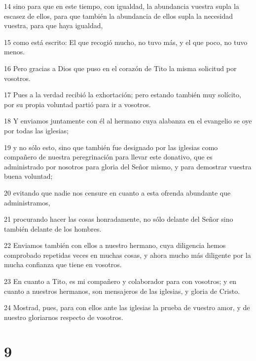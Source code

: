 \par 14 sino para que en este tiempo, con igualdad, la abundancia vuestra supla la escasez de ellos, para que también la abundancia de ellos supla la necesidad vuestra, para que haya igualdad,
\par 15 como está escrito: El que recogió mucho, no tuvo más, y el que poco, no tuvo menos.
\par 16 Pero gracias a Dios que puso en el corazón de Tito la misma solicitud por vosotros.
\par 17 Pues a la verdad recibió la exhortación; pero estando también muy solícito, por su propia voluntad partió para ir a vosotros.
\par 18 Y enviamos juntamente con él al hermano cuya alabanza en el evangelio se oye por todas las iglesias;
\par 19 y no sólo esto, sino que también fue designado por las iglesias como compañero de nuestra peregrinación para llevar este donativo, que es administrado por nosotros para gloria del Señor mismo, y para demostrar vuestra buena voluntad;
\par 20 evitando que nadie nos censure en cuanto a esta ofrenda abundante que administramos,
\par 21 procurando hacer las cosas honradamente, no sólo delante del Señor sino también delante de los hombres.
\par 22 Enviamos también con ellos a nuestro hermano, cuya diligencia hemos comprobado repetidas veces en muchas cosas, y ahora mucho más diligente por la mucha confianza que tiene en vosotros.
\par 23 En cuanto a Tito, es mi compañero y colaborador para con vosotros; y en cuanto a nuestros hermanos, son mensajeros de las iglesias, y gloria de Cristo.
\par 24 Mostrad, pues, para con ellos ante las iglesias la prueba de vuestro amor, y de nuestro gloriarnos respecto de vosotros.

\chapter{9}

